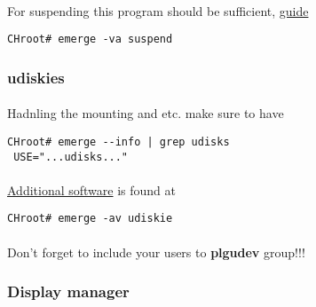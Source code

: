 \documentclass[10pt,a4paper]{article}
\begin{document}
                    \paragraph{} For suspending this program should be sufficient, \href{https://wiki.gentoo.org/wiki/Suspend\_and\_hibernate#Software}{guide}
                    
                    \begin{lstlisting}[style=BashInputCHRoot]
 CHroot# emerge -va suspend
                    \end{lstlisting}
                
                \newpage
                \subsubsection{udiskies}
                    
                    \paragraph{} Hadnling the mounting and etc. make sure to have
                    
                    \begin{lstlisting}[style=BashInputCHRoot]
 CHroot# emerge --info | grep udisks
 USE="...udisks..."
                    \end{lstlisting}
                    
                    \paragraph{} \href{https://wiki.gentoo.org/wiki/Udisks#Emerge}{Additional software} is found at
                    
                    \begin{lstlisting}[style=BashInputCHRoot]
 CHroot# emerge -av udiskie
                    \end{lstlisting}
                    
                    \paragraph{} Don't forget to include your users to \textbf{plgudev} group!!!
                
                \newpage
                \subsubsection{Display manager}
                    
\end{document}
